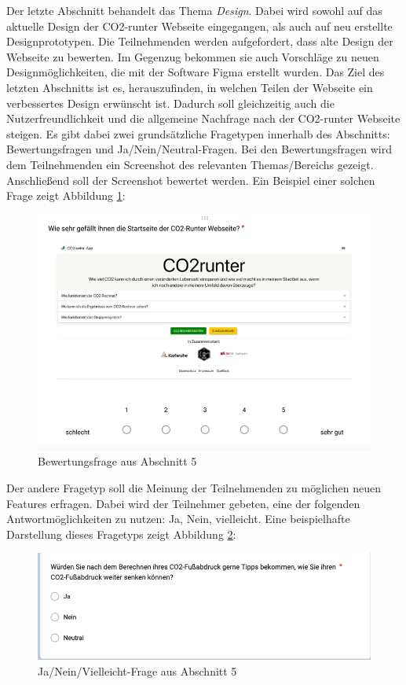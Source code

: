 Der letzte Abschnitt behandelt das Thema \textit{Design}.
Dabei wird sowohl auf das aktuelle Design der CO2-runter Webseite eingegangen, als auch auf neu erstellte Designprototypen.
Die Teilnehmenden werden aufgefordert, dass alte Design der Webseite zu bewerten.
Im Gegenzug bekommen sie auch Vorschläge zu neuen Designmöglichkeiten, die mit der Software Figma erstellt wurden.
Das Ziel des letzten Abschnitts ist es, herauszufinden, in welchen Teilen der Webseite ein verbessertes Design erwünscht ist.
Dadurch soll gleichzeitig auch die Nutzerfreundlichkeit und die allgemeine Nachfrage nach der CO2-runter Webseite steigen.
Es gibt dabei zwei grundsätzliche Fragetypen innerhalb des Abschnitts: Bewertungsfragen und Ja/Nein/Neutral-Fragen.
Bei den Bewertungsfragen wird dem Teilnehmenden ein Screenshot des relevanten Themas/Bereichs gezeigt.
Anschließend soll der Screenshot bewertet werden.
Ein Beispiel einer solchen Frage zeigt Abbildung \ref{fig:picture-of-evaluation-question}:

\begin{figure}[h]
    \centering
    \includegraphics[width=1\textwidth]{images/05/picture_of_evaluation_question}
    \caption{Bewertungsfrage aus Abschnitt 5}
    \label{fig:picture-of-evaluation-question}
\end{figure}

Der andere Fragetyp soll die Meinung der Teilnehmenden zu möglichen neuen Features erfragen.
Dabei wird der Teilnehmer gebeten, eine der folgenden Antwortmöglichkeiten zu nutzen:
Ja, Nein, vielleicht.
Eine beispielhafte Darstellung dieses Fragetyps zeigt Abbildung \ref{fig:picture-of-yes-no-evetually-question}:
\begin{figure}
    \centering
    \includegraphics[width=1\textwidth]{images/05/picture_of_yes_no_eventually_question}
    \caption{Ja/Nein/Vielleicht-Frage aus Abschnitt 5}
    \label{fig:picture-of-yes-no-evetually-question}
\end{figure}

